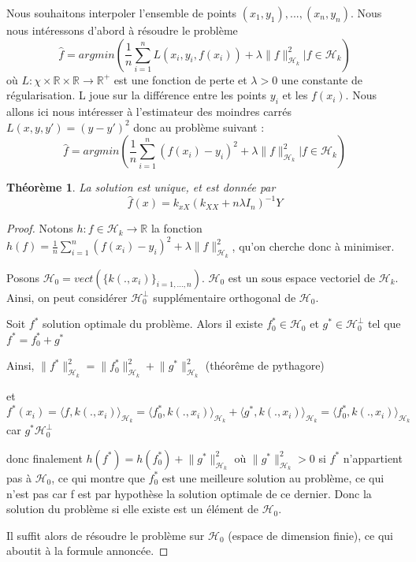 \documentclass[a4paper,12pt]{article}
\newtheorem{theorem}{Théorème}
\begin{document}
Nous souhaitons interpoler l'ensemble de points ${(x_1,y_1),...,(x_n,y_n)}$.
Nous nous intéressons d'abord à résoudre le problème 
$$
\hat{f} = argmin(\frac{1}{n}\sum_{i=1}^nL(x_i,y_i,f(x_i))+\lambda\lVert f\rVert_{\mathcal{H}_k}^2 | f\in\mathcal{H}_k)
$$
où $L:\chi\times\mathbb{R}\times\mathbb{R}\to\mathbb{R}^{+}$ est une fonction de perte et $\lambda >0$ une constante de régularisation. L joue sur la différence entre les points $y_i$ et les $f(x_i)$. Nous allons ici nous intéresser à l'estimateur des moindres carrés $L(x,y,y')=(y-y')^2$ donc au problème suivant :
$$
\hat{f} = argmin(\frac{1}{n}\sum_{i=1}^n(f(x_i)-y_i)^2+\lambda\lVert f\rVert_{\mathcal{H}_k}^2 | f\in\mathcal{H}_k)
$$

\begin{theorem}
    La solution est unique, et est donnée par
$$
\hat{f}(x)=k_{xX}(k_{XX}+n\lambda I_{n})^{-1}Y
$$
\end{theorem}

\begin{proof}
Notons $h:f\in\mathcal{H}_k\to\mathbb{R}$ la fonction $h(f)=\frac{1}{n}\sum_{i=1}^n(f(x_i)-y_i)^2+\lambda\lVert f\rVert_{\mathcal{H}_k}^2$, qu'on cherche donc à minimiser.

Posons $\mathcal{H}_0=vect(\{k(.,x_i)\}_{i=1,...,n})$. $\mathcal{H}_0$ est un sous espace vectoriel de $\mathcal{H}_k$. Ainsi, on peut considérer $\mathcal{H}_0^\perp$ supplémentaire orthogonal de $\mathcal{H}_0$. 

Soit $f^*$ solution optimale du problème. Alors il existe $f^*_0\in\mathcal{H}_0$ et $g^*\in\mathcal{H}_0^\perp$ tel que $f^*=f^*_0+g^*$

Ainsi, $\lVert f^*\rVert_{\mathcal{H}_k}^2=\lVert f^*_0\rVert_{\mathcal{H}_k}^2+\lVert g^*\rVert_{\mathcal{H}_k}^2$ (théorême de pythagore)

et $f^*(x_i)=\langle f,k(.,x_i)\rangle_{\mathcal{H}_k}=\langle f^*_0,k(.,x_i)\rangle_{\mathcal{H}_k}+\langle g^*,k(.,x_i)\rangle_{\mathcal{H}_k}=\langle f^*_0,k(.,x_i)\rangle_{\mathcal{H}_k}$ car $g^*\mathcal{H}_0^\perp$

donc finalement $h(f^*)=h(f^*_0)+\lVert g^*\rVert_{\mathcal{H}_k}^2$ où $\lVert g^*\rVert_{\mathcal{H}_k}^2 >0$ si $f^*$ n'appartient pas à $\mathcal{H}_0$, ce qui montre que $f^*_0$ est une meilleure solution au problème, ce qui n'est pas car f est par hypothèse la solution optimale de ce dernier. Donc la solution du problème si elle existe est un élément de $\mathcal{H}_0$.

Il suffit alors de résoudre le problème sur $\mathcal{H}_0$ (espace de dimension finie), ce qui aboutit à la formule annoncée.
\end{proof}
\end{document}
